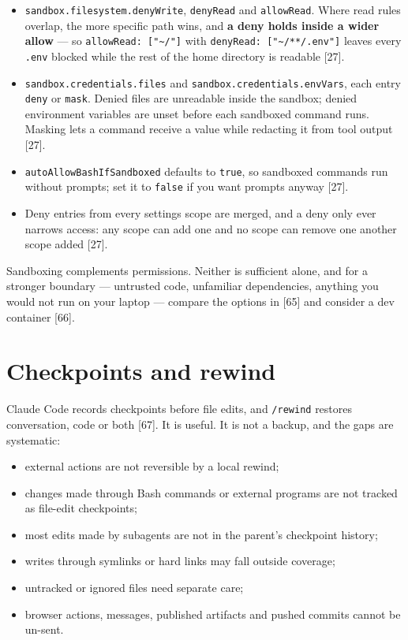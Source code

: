 \documentclass[11pt,a4paper,twoside,openany]{book}
\begin{document}
\begin{itemize}
\item \texttt{sandbox.\allowbreak{}filesystem.\allowbreak{}deny\allowbreak{}Write}, \texttt{deny\allowbreak{}Read} and \texttt{allow\allowbreak{}Read}. Where read rules overlap, the more specific path wins, and \textbf{a deny holds inside a wider allow} — so \texttt{allow\allowbreak{}Read:\allowbreak{} ["\textasciitilde{}/\allowbreak{}"]} with \texttt{deny\allowbreak{}Read:\allowbreak{} ["\textasciitilde{}/\allowbreak{}**/\allowbreak{}.\allowbreak{}env"]} leaves every \texttt{.\allowbreak{}env} blocked while the rest of the home directory is readable [27].
\item \texttt{sandbox.\allowbreak{}credentials.\allowbreak{}files} and \texttt{sandbox.\allowbreak{}credentials.\allowbreak{}env\allowbreak{}Vars}, each entry \texttt{deny} or \texttt{mask}. Denied files are unreadable inside the sandbox; denied environment variables are unset before each sandboxed command runs. Masking lets a command receive a value while redacting it from tool output [27].
\item \texttt{auto\allowbreak{}Allow\allowbreak{}Bash\allowbreak{}If\allowbreak{}Sandboxed} defaults to \texttt{true}, so sandboxed commands run without prompts; set it to \texttt{false} if you want prompts anyway [27].
\item Deny entries from every settings scope are merged, and a deny only ever narrows access: any scope can add one and no scope can remove one another scope added [27].
\end{itemize}

Sandboxing complements permissions. Neither is sufficient alone, and for a stronger boundary — untrusted code, unfamiliar dependencies, anything you would not run on your laptop — compare the options in [65] and consider a dev container [66].


\FloatBarrier
\setcounter{section}{4}
\section{Checkpoints and rewind}

Claude Code records checkpoints before file edits, and \texttt{/\allowbreak{}rewind} restores conversation, code or both [67]. It is useful. It is not a backup, and the gaps are systematic:


\begin{itemize}
\item external actions are not reversible by a local rewind;
\item changes made through Bash commands or external programs are not tracked as file-edit checkpoints;
\item most edits made by subagents are not in the parent's checkpoint history;
\item writes through symlinks or hard links may fall outside coverage;
\item untracked or ignored files need separate care;
\item browser actions, messages, published artifacts and pushed commits cannot be un-sent.
\end{itemize}
\end{document}

